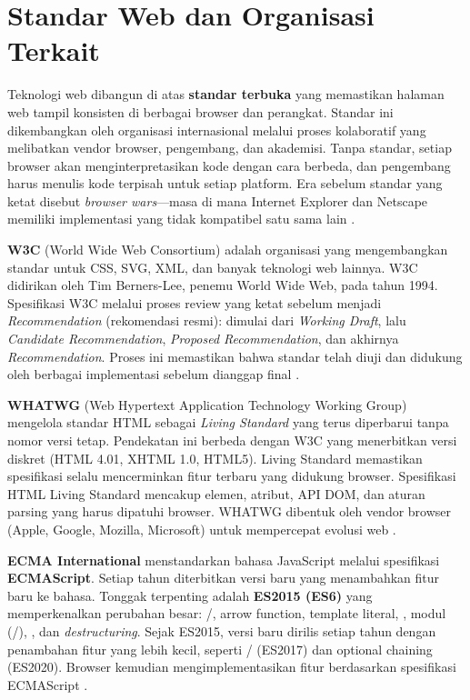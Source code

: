 ﻿\section{Standar Web dan Organisasi Terkait}
Teknologi web dibangun di atas \textbf{standar terbuka} yang memastikan halaman web tampil konsisten di berbagai browser dan perangkat. Standar ini dikembangkan oleh organisasi internasional melalui proses kolaboratif yang melibatkan vendor browser, pengembang, dan akademisi. Tanpa standar, setiap browser akan menginterpretasikan kode dengan cara berbeda, dan pengembang harus menulis kode terpisah untuk setiap platform. Era sebelum standar yang ketat disebut \textit{browser wars}---masa di mana Internet Explorer dan Netscape memiliki implementasi yang tidak kompatibel satu sama lain \cite{mdnLearn}.

\textbf{W3C} (World Wide Web Consortium) adalah organisasi yang mengembangkan standar untuk CSS, SVG, XML, dan banyak teknologi web lainnya. W3C didirikan oleh Tim Berners-Lee, penemu World Wide Web, pada tahun 1994. Spesifikasi W3C melalui proses review yang ketat sebelum menjadi \textit{Recommendation} (rekomendasi resmi): dimulai dari \textit{Working Draft}, lalu \textit{Candidate Recommendation}, \textit{Proposed Recommendation}, dan akhirnya \textit{Recommendation}. Proses ini memastikan bahwa standar telah diuji dan didukung oleh berbagai implementasi sebelum dianggap final \cite{w3cCss}.

\textbf{WHATWG} (Web Hypertext Application Technology Working Group) mengelola standar HTML sebagai \textit{Living Standard} yang terus diperbarui tanpa nomor versi tetap. Pendekatan ini berbeda dengan W3C yang menerbitkan versi diskret (HTML 4.01, XHTML 1.0, HTML5). Living Standard memastikan spesifikasi selalu mencerminkan fitur terbaru yang didukung browser. Spesifikasi HTML Living Standard mencakup elemen, atribut, API DOM, dan aturan parsing yang harus dipatuhi browser. WHATWG dibentuk oleh vendor browser (Apple, Google, Mozilla, Microsoft) untuk mempercepat evolusi web \cite{whatwgHtml}.

\textbf{ECMA International} menstandarkan bahasa JavaScript melalui spesifikasi \textbf{ECMAScript}. Setiap tahun diterbitkan versi baru yang menambahkan fitur baru ke bahasa. Tonggak terpenting adalah \textbf{ES2015 (ES6)} yang memperkenalkan perubahan besar: /, arrow function, template literal, , modul (/), , dan \textit{destructuring}. Sejak ES2015, versi baru dirilis setiap tahun dengan penambahan fitur yang lebih kecil, seperti / (ES2017) dan optional chaining (ES2020). Browser kemudian mengimplementasikan fitur berdasarkan spesifikasi ECMAScript \cite{mdnJsGuide}.

